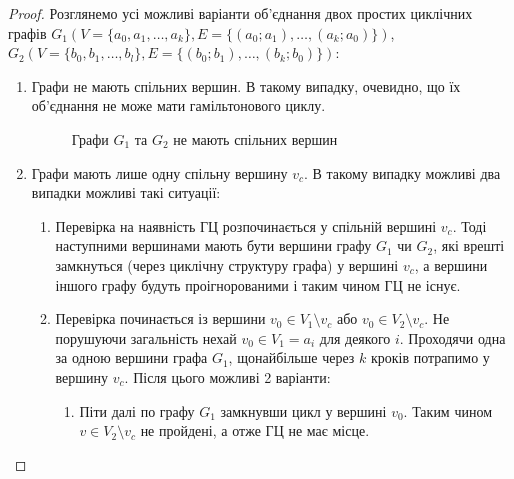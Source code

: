 \documentclass[a4paper,14pt,ukrainian]{extarticle}
\begin{document}
    \begin{proof}
        Розглянемо усі можливі варіанти об’єднання двох простих циклічних графів $G_1(V=\lbrace a_0, a_1, \dots, a_k \rbrace ,E= \lbrace (a_0; a_1), \dots, (a_k; a_0) \rbrace)$, $G_2(V= \lbrace b_0, b_1, \dots, b_l \rbrace, E= \lbrace (b_0; b_1), \dots, (b_k; b_0) \rbrace )$:
        \begin{enumerate}
            \item Графи не мають спільних вершин. В такому випадку, очевидно, що їх об’єднання не може мати гамільтонового циклу.
                \begin{figure}[h]
                    \caption{Графи $G_1$ та $G_2$ не мають спільних вершин}
                    \centering
                \end{figure}
            \item Графи мають лише одну спільну вершину $v_c$. В такому випадку можливі два випадки можливі такі ситуації:
                \begin{enumerate}
                    \item Перевірка на наявність ГЦ розпочинається у спільній вершині $v_c$. Тоді наступними вершинами мають бути вершини графу $G_1$ чи $G_2$, які врешті замкнуться (через циклічну структуру графа) у вершині $v_c$, а вершини іншого графу будуть проігнорованими і таким чином ГЦ не існує.
                    \item Перевірка починається із вершини $v_0 \in V_1 \setminus v_c$ або $v_0 \in V_2 \setminus v_c$. Не порушуючи загальність нехай $v_0 \in V_1 = a_i$ для деякого $i$.
                        Проходячи одна за одною вершини графа $G_1$, щонайбільше через $k$ кроків потрапимо у вершину $v_c$. Після цього можливі 2 варіанти:
                        \begin{enumerate}
                            \item Піти далі по графу $G_1$ замкнувши цикл у вершині $v_0$. Таким чином $v \in V_2 \setminus v_c$ не пройдені, а отже ГЦ не має місце.

\end{enumerate}
\end{enumerate}
\end{enumerate}
\end{proof}
\end{document}
